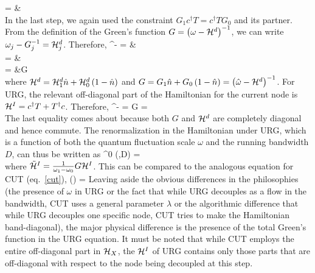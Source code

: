 \documentclass[12pt,twoside]{article}
\numberwithin{equation}{section}
\begin{document}
= &\\
\eeq
In the last step, we again used the constraint \(G_1 c^\dagger T = c^\dagger T G_0\) and its partner. From the definition of the Green's function \(G = \left({\omega - \mathcal{H}^d}\right)^{-1}\), we can write \(\omega_j - G_j^{-1} = \mathcal{H}^d_j\). Therefore,
\beq
\eta^\dagger - \eta = &\\
= &\\
= &G\\
\eeq
where \(\mathcal{H}^d = \mathcal{H}^d_1 \hat n + \mathcal{H}^d_0 \left({1 - \hat n}\right)\) and \(G = G_1 \hat n + G_0 \left({1 -\hat n}\right) = \left({\hat \omega - \mathcal{H}^d}\right)^{-1}\). For URG, the relevant off-diagonal part of the Hamiltonian for the current node is \(\mathcal{H}^I = c^\dagger T + T^\dagger c\). Therefore,
\beq
\eta^\dagger - \eta = G = \\
\eeq
The last equality comes about because both \(G\) and \(\mathcal{H}^d\) are completely diagonal and hence commute. The renormalization in the Hamiltonian under URG, which is a function of both the quantum fluctuation scale \(\omega\) and the running bandwidth \(D\), can thus be written as
\beq[dbrack]
\Delta \ham^0 (\omega,D) =  \\
\eeq
where \(\tilde {\mathcal{H}}^I = \frac{1}{\omega_1 - \omega_0}G\mathcal{H}^I\). This can be compared to the analogous equation for CUT (eq.~\ref{cut}),
\beq
\Delta{\ham}(\lambda) = \Delta{\lambda}
\eeq
Leaving aside the obvious differences in the philosophies (the presence of \(\omega\) in URG or the fact that while URG decouples as a flow in the bandwidth, CUT uses a general parameter \(\lambda\) or the algorithmic difference that while URG decouples one specific node, CUT tries to make the Hamiltonian band-diagonal), the major physical difference is the presence of the total Green's function in the URG equation. It must be noted that while CUT employs the entire off-diagonal part in \(\mathcal{H}_X\), the \(\mathcal{H}^I\) of URG contains only those parts that are off-diagonal with respect to the node being decoupled at this step.
\end{document}
